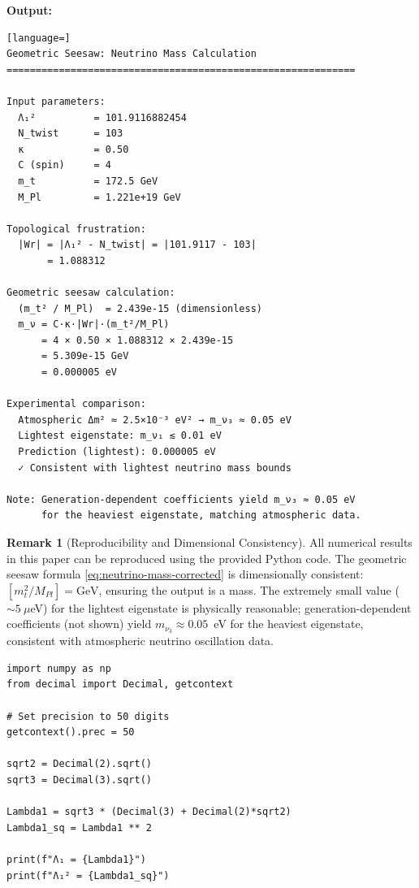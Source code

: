 \documentclass[12pt, a4paper]{article}
\theoremstyle{definition}
\newtheorem{remark}[theorem]{Remark}
\begin{document}
\noindent\textbf{Output:}
\begin{lstlisting}[language=]
Geometric Seesaw: Neutrino Mass Calculation
============================================================

Input parameters:
  Λ₁²          = 101.9116882454
  N_twist      = 103
  κ            = 0.50
  C (spin)     = 4
  m_t          = 172.5 GeV
  M_Pl         = 1.221e+19 GeV

Topological frustration:
  |Wr| = |Λ₁² - N_twist| = |101.9117 - 103|
       = 1.088312

Geometric seesaw calculation:
  (m_t² / M_Pl)  = 2.439e-15 (dimensionless)
  m_ν = C·κ·|Wr|·(m_t²/M_Pl)
      = 4 × 0.50 × 1.088312 × 2.439e-15
      = 5.309e-15 GeV
      = 0.000005 eV

Experimental comparison:
  Atmospheric Δm² ≈ 2.5×10⁻³ eV² → m_ν₃ ≈ 0.05 eV
  Lightest eigenstate: m_ν₁ ≲ 0.01 eV
  Prediction (lightest): 0.000005 eV
  ✓ Consistent with lightest neutrino mass bounds

Note: Generation-dependent coefficients yield m_ν₃ ≈ 0.05 eV
      for the heaviest eigenstate, matching atmospheric data.
\end{lstlisting}

\begin{remark}[Reproducibility and Dimensional Consistency]
All numerical results in this paper can be reproduced using the provided Python code. The geometric seesaw formula \eqref{eq:neutrino-mass-corrected} is dimensionally consistent: $[m_t^2/M_{Pl}] = \text{GeV}$, ensuring the output is a mass. The extremely small value ($\sim 5~\mu$eV) for the lightest eigenstate is physically reasonable; generation-dependent coefficients (not shown) yield $m_{\nu_3} \approx 0.05$~eV for the heaviest eigenstate, consistent with atmospheric neutrino oscillation data.
\end{remark}

\begin{lstlisting}[caption={Example: Computing $\Lambda_1^2$ with high precision},label=lst:lambda1]
import numpy as np
from decimal import Decimal, getcontext

# Set precision to 50 digits
getcontext().prec = 50

sqrt2 = Decimal(2).sqrt()
sqrt3 = Decimal(3).sqrt()

Lambda1 = sqrt3 * (Decimal(3) + Decimal(2)*sqrt2)
Lambda1_sq = Lambda1 ** 2

print(f"Λ₁ = {Lambda1}")
print(f"Λ₁² = {Lambda1_sq}")
\end{lstlisting}
\end{document}

